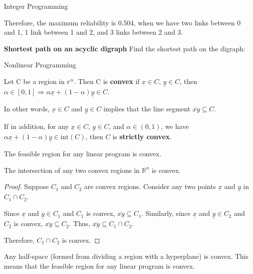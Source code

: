 \documentclass{article}
\begin{document}
\begin{section}{Integer Programming}
\begin{answer}
    Therefore, the maximum reliability is 0.504, when we have two links between 0 and 1, 1 link between 
    1 and 2, and 3 links between 2 and 3.
\end{answer}

\begin{eg}{\textbf{Shortest path on an acyclic digraph}}
    Find the shortest path on the digraph: \\
    
\end{eg}

\begin{section}{Nonlinear Programming}

\begin{definition}
    Let C be a region in \(\mathbb{r}^n\). Then C is \textbf{convex} if 
    \(\underline{x}\in C\), \(\underline{y}\in C\), then \(\alpha \in[0,1]\Rightarrow \alpha \underline{x}+(1-\alpha)\underline{y}\in C\).

    In other words, \(\underline{x}\in C\) and \(\underline{y}\in C\) implies that the line segment \(\overline{xy}\subseteq C\).   
\end{definition}

\begin{definition}
    If in addition, for any \(\underline{x}\in C\), \(\underline{y}\in C\), and \(\alpha \in(0,1)\), we have \(\alpha \underline{x}+(1-\alpha)\underline{y}\in \text{int}(C)\), then \(C\) is \textbf{strictly convex}.
\end{definition}

The feasible region for any linear program is convex.

\begin{theorem}
    The intersection of any two convex regions in \(\mathbb{R}^n\) is convex. 
\end{theorem}
\begin{proof}
    Suppose \(C_1\) and \(C_2\) are convex regions. Consider any two points \(\underline{x}\) and 
    \(\underline{y}\) in \(C_1\cap C_2\). 
    
    Since \(\underline{x}\) and \(\underline{y}\in C_1\) and \(C_1\) is convex, \(\overline{xy}\subseteq C_1\). Similarly, 
    since \(\underline{x}\) and \(\underline{y}\in C_2\) and \(C_2\) is convex, \(\overline{xy}\subseteq C_2\). Thus, \(\overline{xy}\subseteq C_1\cap C_2\). 

    Therefore, \(C_1\cap C_2\) is convex.
\end{proof}

\begin{note}
    Any half-space (formed from dividing a region with a hyperplane) is convex. This means 
    that the feasible region for any linear program is convex.
\end{note}


\end{section}
\end{section}
\end{document}
